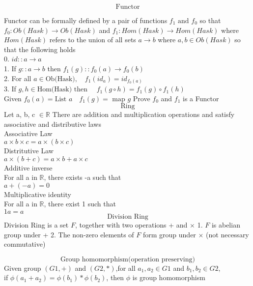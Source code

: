 \documentclass{book}
\begin{document}
\[ \text{Functor} \]

Functor can be formally defined by a pair of functions $f_1 \mbox{ and } f_0$ 
so that $f_0:Ob(Hask) \rightarrow Ob(Hask)$ and $f_1:Hom(Hask) \rightarrow Hom(Hask)$
where $Hom(Hask)$ refers to the union of all sets $a \rightarrow b$ where $a, b \in Ob(Hask)$
so that the following holds \\

0. $id::a \rightarrow a $ \\
1. If $g::a \rightarrow b $ then $f_1(g)::f_0(a) \rightarrow f_0(b)$ \\
2. For all $a \in \mbox{Ob(Hask)}, \quad f_1(id_a) = id_{f_0(a)} $ \\
3. If $g,h \in \mbox{Hom(Hask)} \mbox{ then } \quad f_1(g \circ h) = f_1(g) \circ f_1(h)$ \\
Given $f_0(a) = \mbox{List } a \quad f_1(g) = \mbox{ map } g   $ \medskip 
Prove $f_0$ and $f_1$ is a Functor \\

\[ \text{ Ring } \]
Let a, b, c $\in  \mathbb{R}$ There are addition and multiplication operations and satisfy associative and distributive laws\\

Associative Law\\
$ a \times b \times c = a \times (b \times c) $\\

Distritutive Law\\
$a \times (b + c) = a \times b + a \times c $\\

Additive inverse\\
For all a in $\mathbb{R}$, there exists -a such that\\
$a + (-a) = 0$\\

Multiplicative identity \\
For all a in $\mathbb{R}$, there exist 1 such that\\
$1a = a$ \\

\[ \text{Division Ring} \] 
Division Ring is a set $F$, together with two operations + and $\times$ 
1. $F$ is abelian group under +
2. The non-zero elements of $F$ form group under $\times$ (not necessary commutative)

\[\text{Group homomorphism(operation preserving)}\]
Given group $(G1, +)$ and $(G2, *)$,for all $a_1, a_2 \in G1$ and $b_1, b_2 \in G2$,\\
if $\phi(a_1 + a_2) = \phi(b_1)*\phi(b_2)$, then $\phi$ is group homomorphism\\
\end{document}
